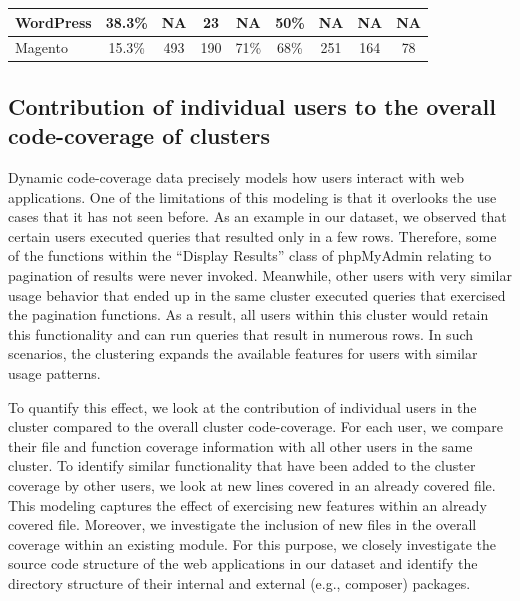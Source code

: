 \begin{table}[]
{\begin{tabular}{|l|c|c|c|c|c|ccc|}
    WordPress                                   & 38.3\%                                                                                          & NA                                    & 23                                   & NA                                                             & 50\%                                    & \multicolumn{1}{c|}{NA}                         & \multicolumn{1}{c|}{NA}                 & \multicolumn{1}{c|}{NA}  \\ \hline
    Magento                                     & 15.3\%                                                                                          & 493                                   & 190                                  & 71\%                                                           & 68\%                                    & \multicolumn{1}{c|}{251}                        & \multicolumn{1}{c|}{164}                & \multicolumn{1}{c|}{78}  \\ \hline
    \end{tabular}
    }
\end{table}

\subsection{Contribution of individual users to the overall code-coverage of clusters}
\label{sec:augmented_coverage}

Dynamic code-coverage data precisely models how users interact with web applications. 
One of the limitations of this modeling is that it overlooks the use cases that it has not seen before. 
As an example in our dataset, we observed that certain users executed queries that resulted only in a few rows. 
Therefore, some of the functions within the ``Display Results'' class of phpMyAdmin relating to pagination of results were never invoked. 
Meanwhile, other users with very similar usage behavior that ended up in the same cluster executed queries that exercised the pagination functions. 
As a result, all users within this cluster would retain this functionality and can run queries that result in numerous rows.
In such scenarios, the clustering expands the available features for users with similar usage patterns. 

To quantify this effect, we look at the contribution of individual users in the cluster compared to the overall cluster code-coverage. 
For each user, we compare their file and function coverage information with all other users in the same cluster. 
To identify similar functionality that have been added to the cluster coverage by other users, we look at new lines covered in an already covered file. 
This modeling captures the effect of exercising new features within an already covered file.
Moreover, we investigate the inclusion of new files in the overall coverage within an existing module. 
For this purpose, we closely investigate the source code structure of the web applications in our dataset and identify the directory structure of their internal and external (e.g., composer) packages. 

